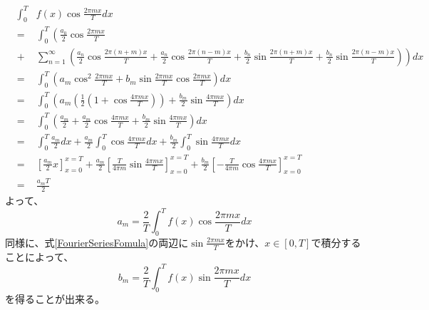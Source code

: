 \documentclass[a4paper]{jsarticle}
\begin{document}
\begin{eqnarray}
	&{\int _0 ^T}& f \left( x \right) \cos \frac { 2 \pi mx } { T } dx \nonumber \\
	&=& \int _0 ^T \left( \frac { a_0 } { 2 } \cos \frac { 2 \pi mx } { T } \right. \nonumber \\
	&+& \left. \sum _{ n = 1} ^\infty \left( \frac { a_n } { 2 } \cos \frac { 2 \pi \left( n + m \right) x } { T } + \frac { a_n } { 2 } \cos \frac { 2 \pi \left( n - m \right) x } { T } + \frac { b_n } { 2 } \sin \frac { 2 \pi \left( n + m \right) x } { T } + \frac { b_n } { 2 } \sin \frac { 2 \pi \left( n - m \right) x } { T } \right) \right) dx \nonumber \\
	&=& \int _0 ^T \left( a_m \cos ^2 \frac { 2 \pi mx } { T } + b_m \sin \frac { 2 \pi mx } { T } \cos \frac { 2 \pi mx } { T } \right) dx \nonumber \\
	&=& \int _0 ^T \left( a_m \left( \frac { 1 } { 2 } \left( 1 + \cos \frac { 4 \pi mx } { T } \right) \right) + \frac { b_m } { 2 } \sin \frac { 4 \pi mx } { T } \right) dx \nonumber \\
	&=& \int _0 ^T \left( \frac { a_m } { 2 } + \frac { a_m } { 2 } \cos \frac { 4 \pi mx } { T } + \frac { b_m } { 2 } \sin \frac { 4 \pi mx } { T } \right) dx \nonumber \\
	&=& \int _0 ^T \frac { a_m } { 2 } dx + \frac { a_m } { 2 } \int _0 ^T \cos \frac { 4 \pi mx } { T } dx + \frac { b_m } { 2 } \int _0 ^T \sin \frac { 4 \pi mx } { T } dx \nonumber \\
	&=& \left[ \frac { a_m } { 2 } x \right] _{ x = 0 } ^{ x = T } + \frac { a_m } { 2 } \left[ \frac { T } { 4 \pi m } \sin \frac { 4 \pi mx } { T } \right] _{ x = 0 } ^{ x = T } + \frac { b_m } { 2 } \left[ - \frac { T } { 4 \pi m } \cos \frac { 4 \pi mx } { T } \right] _{ x = 0 } ^{ x = T } \nonumber \\
	&=& \frac { a_mT } { 2 }
\end{eqnarray}
よって、
\begin{equation}
a_m = \frac { 2 } { T } \int _0 ^T f \left( x \right) \cos \frac { 2 \pi mx } { T } dx
\end{equation}
同様に、式\ref{FourierSeriesFomula}の両辺に$\sin \frac { 2 \pi mx } { T }$をかけ、$x \in \left[ 0,T \right]$で積分することによって、
\begin{equation}
b_m = \frac { 2 } { T } \int _0 ^T f \left( x \right) \sin \frac { 2 \pi mx } { T } dx
\end{equation}
を得ることが出来る。
\end{document}
